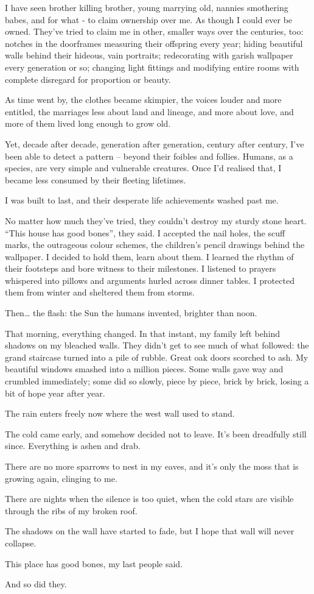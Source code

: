 I have seen brother killing brother, young marrying old, nannies
smothering babes, and for what - to claim ownership over me. As though
I could ever be owned. They’ve tried to claim me in other, smaller
ways over the centuries, too: notches in the doorframes measuring
their offspring every year; hiding beautiful walls behind their
hideous, vain portraits; redecorating with garish wallpaper every
generation or so; changing light fittings and modifying entire rooms
with complete disregard for proportion or beauty.

As time went by, the clothes became skimpier, the voices louder and
more entitled, the marriages less about land and lineage, and more
about love, and more of them lived long enough to grow old.

Yet, decade after decade, generation after generation, century after
century, I’ve been able to detect a pattern – beyond their foibles and
follies. Humans, as a species, are very simple and vulnerable
creatures. Once I’d realised that, I became less consumed by their
fleeting lifetimes.

I was built to last, and their desperate life achievements washed past me.

No matter how much they’ve tried, they couldn’t destroy my sturdy
stone heart. “This house has good bones”, they said. I accepted the
nail holes, the scuff marks, the outrageous colour schemes, the
children’s pencil drawings behind the wallpaper. I decided to hold
them, learn about them. I learned the rhythm of their footsteps and
bore witness to their milestones. I listened to prayers whispered into
pillows and arguments hurled across dinner tables. I protected them
from winter and sheltered them from storms.

Then… the flash: the Sun the humans invented, brighter than noon.

That morning, everything changed. In that instant, my family left
behind shadows on my bleached walls. They didn’t get to see much of
what followed: the grand staircase turned into a pile of rubble. Great
oak doors scorched to ash. My beautiful windows smashed into a million
pieces. Some walls gave way and crumbled immediately; some did so
slowly, piece by piece, brick by brick, losing a bit of hope year
after year.

The rain enters freely now where the west wall used to stand.

The cold came early, and somehow decided not to leave. It’s been
dreadfully still since. Everything is ashen and drab.

There are no more sparrows to nest in my eaves, and it’s only the moss
that is growing again, clinging to me.

There are nights when the silence is too quiet, when the cold stars
are visible through the ribs of my broken roof.

The shadows on the wall have started to fade, but I hope that wall
will never collapse.

This place has good bones, my last people said.

And so did they.


